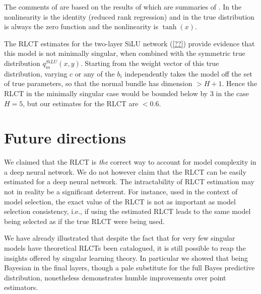 \documentclass{article} %
\begin{document}
The comments of \citep[\S 7.6]{watanabe_algebraic_2009} are based on the results of \citep[\S 7.2]{watanabe_algebraic_2009} which are summaries of \cite{??,??}. In \cite{??} the nonlinearity is the identity (reduced rank regression) and in \cite{??} the true distribution is always the zero function and the nonlinearity is $\operatorname{tanh}(x)$.

The RLCT estimates for the two-layer SiLU network (\ref{??}) provide evidence that this model is not minimally singular, when combined with the symmetric true distribution $q^{SiLU}_m(x,y)$. Starting from the weight vector of this true distribution, varying $c$ or any of the $b_i$ independently takes the model off the set of true parameters, so that the normal bundle has dimension $> H + 1$. Hence the RLCT in the minimally singular case would be bounded below by $3$ in the case $H = 5$, but our estimates for the RLCT are $< 0.6$.

\section{Future directions}
We claimed that the RLCT is \textit{the} correct way to account for model complexity in a deep neural network. We do not however claim that the RLCT can be easily estimated for a deep neural network. The intractability of RLCT estimation may not in reality be a significant deterrent. For instance, used in the context of model selection, the exact value of the RLCT is not as important as model selection consistency, i.e., if using the estimated RLCT leads to the same model being selected as if the true RLCT were being used. 

We have already illustrated that despite the fact that for very few singular models have theoretical RLCTs been catalogued, it is still possible to reap the insights offered by singular learning theory. In particular we showed that being Bayesian in the final layers, though a pale substitute for the full Bayes predictive distribution, nonetheless demonstrates humble improvements over point estimators. 
%
\end{document}
